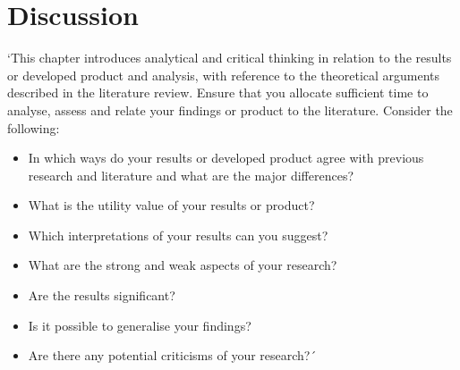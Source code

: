 \chapter{Discussion}
\label{ch:discussion}

`This chapter introduces analytical and critical thinking in relation to the results or developed
product and analysis, with reference to the theoretical arguments described in the literature
review. Ensure that you allocate sufficient time to analyse, assess and relate your findings or
product to the literature.
Consider the following:
\begin{itemize}
    \item In which ways do your results or developed product agree with previous research and
    literature and what are the major differences?
    \item What is the utility value of your results or product?
    \item Which interpretations of your results can you suggest?
    \item What are the strong and weak aspects of your research?
    \item Are the results significant?
    \item Is it possible to generalise your findings?
    \item Are there any potential criticisms of your research?´
\end{itemize} \citep{handbook}
